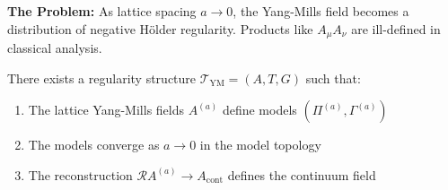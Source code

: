 \textbf{The Problem:} As lattice spacing $a \to 0$, the Yang-Mills field 
becomes a distribution of negative Hölder regularity. Products like $A_\mu A_\nu$ 
are ill-defined in classical analysis.

\begin{theorem}
\label{thm:gap-b-regularity}
There exists a regularity structure $\mathscr{T}_{\mathrm{YM}} = (A, T, G)$ such that:
\begin{enumerate}
\item The lattice Yang-Mills fields $A^{(a)}$ define models $(\Pi^{(a)}, \Gamma^{(a)})$
\item The models converge as $a \to 0$ in the model topology
\item The reconstruction $\mathcal{R}A^{(a)} \to A_{\mathrm{cont}}$ defines the 
    continuum field
\end{enumerate}
\end{theorem}


